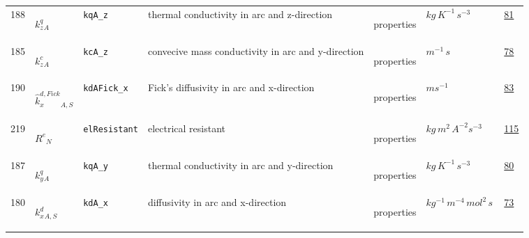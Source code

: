 \begin{longtable}{|p{1cm}|p{2.5cm}|p{4.5cm}|p{8cm}|p{3.0cm}|p{3cm}|p{1cm}|}
            188
             & \hypertarget{"v:188"}{ $ {{k^q_z}}{_{A}} $}
             & \verb|kqA_z|
             & thermal conductivity in arc and z-direction
             & \begin{lay}properties \end{lay}
             & $ kg \,K^{-1} \,s^{-3} \, $
             &                 \hyperlink{"e:81"}{ 81 }
                 \\
            185
             & \hypertarget{"v:185"}{ $ {{k^c_z}}{_{A}} $}
             & \verb|kcA_z|
             & convecive mass conductivity in arc and y-direction
             & \begin{lay}properties \end{lay}
             & $ m^{-1} \,s \, $
             &                 \hyperlink{"e:78"}{ 78 }
                 \\
            190
             & \hypertarget{"v:190"}{ $ {{\hat{k}^{d,Fick}_x}}{_{A, S}} $}
             & \verb|kdAFick_x|
             & Fick's diffusivity in arc and x-direction
             & \begin{lay}properties \end{lay}
             & $ m s^{-1} \, $
             &                 \hyperlink{"e:83"}{ 83 }
                 \\
            219
             & \hypertarget{"v:219"}{ $ {{R^e}}{_{N}} $}
             & \verb|elResistant|
             & electrical resistant
             & \begin{lay}properties \end{lay}
             & $ kg \,m^{2} \,A^{-2} s^{-3} \, $
             &                 \hyperlink{"e:115"}{ 115 }
                 \\
            187
             & \hypertarget{"v:187"}{ $ {{k^q_y}}{_{A}} $}
             & \verb|kqA_y|
             & thermal conductivity in arc and y-direction
             & \begin{lay}properties \end{lay}
             & $ kg \,K^{-1} \,s^{-3} \, $
             &                 \hyperlink{"e:80"}{ 80 }
                 \\
            180
             & \hypertarget{"v:180"}{ $ {{k^d_x}}{_{A, S}} $}
             & \verb|kdA_x|
             & diffusivity in arc and x-direction
             & \begin{lay}properties \end{lay}
             & $ kg^{-1} \,m^{-4} \,mol^{2} \,s \, $
             &                 \hyperlink{"e:73"}{ 73 }

\end{longtable}
